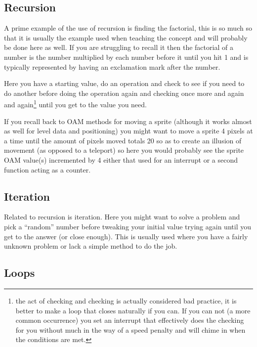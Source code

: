 \documentclass[
]{book}
\begin{document}
\hypertarget{recursion}{%
\subsection{Recursion}\label{recursion}}

A prime example of the use of recursion is finding the factorial, this is so much so that it is usually the example used when teaching the concept and will probably be done here as well. If you are struggling to recall it then the factorial of a number is the number multiplied by each number before it until you hit 1 and is typically represented by having an exclamation mark after the number.

Here you have a starting value, do an operation and check to see if you need to do another before doing the operation again and checking once more and again and again\footnote{the act of checking and checking is actually considered bad practice, it is better to make a loop that closes naturally if you can. If you can not (a more common occurrence) you set an interrupt that effectively does the checking for you without much in the way of a speed penalty and will chime in when the conditions are met.} until you get to the value you need.

If you recall back to OAM methods for moving a sprite (although it works almost as well for level data and positioning) you might want to move a sprite 4 pixels at a time until the amount of pixels moved totals 20 so as to create an illusion of movement (as opposed to a teleport) so here you would probably see the sprite OAM value(s) incremented by 4 either that used for an interrupt or a second function acting as a counter.

\hypertarget{iteration}{%
\subsection{Iteration}\label{iteration}}

Related to recursion is iteration. Here you might want to solve a problem and pick a ``random'' number before tweaking your initial value trying again until you get to the answer (or close enough). This is usually used where you have a fairly unknown problem or lack a simple method to do the job.

\hypertarget{loops}{%
\subsection{Loops}\label{loops}}
\end{document}

